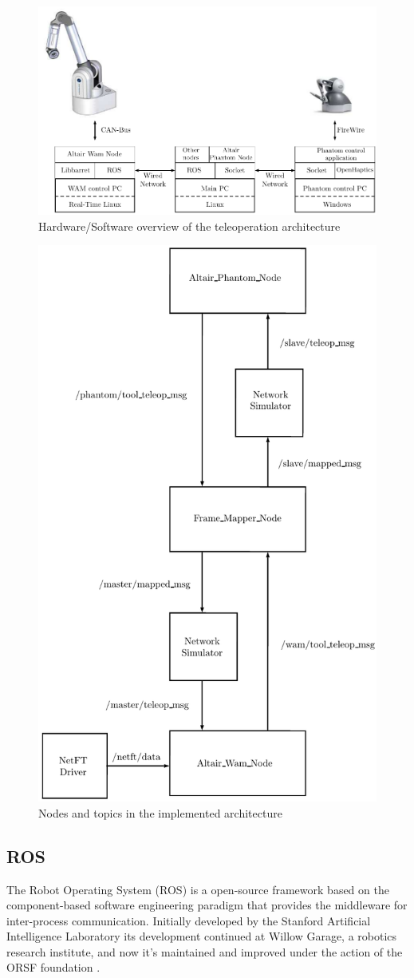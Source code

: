 \begin{figure}
	\includegraphics[width=\linewidth]{schemas/Hardware_Arch.pdf}
	\caption[Architecture overview]{Hardware/Software overview of the teleoperation architecture}
	\label{sch:Harware_Arch}
\end{figure}
\begin{figure}
	\includegraphics[height=\linewidth, angle =90]{schemas/Teleop_topics_node.pdf}
	\caption[ROS nodes and topics]{Nodes and topics in the implemented architecture }
	\label{sch:Teleop_topics_node}
\end{figure}
\subsection{ROS}
The Robot Operating System (ROS) \cite{ROS} is a open-source framework
based on the component-based software engineering paradigm that provides
the middleware for inter-process communication. Initially developed by the Stanford 
Artificial Intelligence Laboratory its development continued at Willow Garage, a robotics research institute, and now it's maintained and improved under the action of the ORSF foundation \cite{ROS}.

